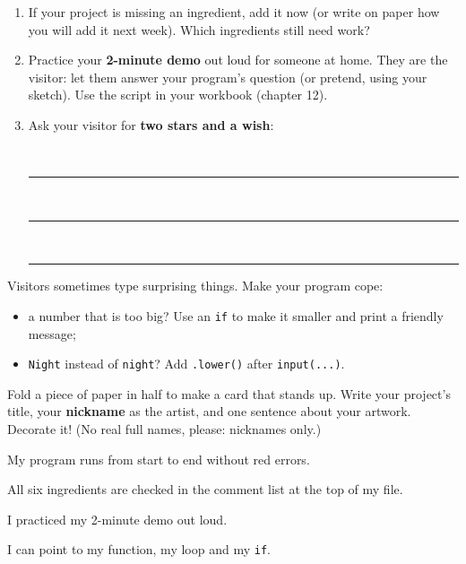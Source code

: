 \namedateline

\begin{core}
\begin{enumerate}[leftmargin=1.4em,itemsep=2pt]
  \item If your project is missing an ingredient, add it now (or write on paper how you will add it next week). Which ingredients still need work?
  \item Practice your \textbf{2-minute demo} out loud for someone at home. They are the visitor: let them answer your program's question (or pretend, using your sketch). Use the script in your workbook (chapter 12).
  \item Ask your visitor for \textbf{two stars and a wish}:\par
  \faStar\ \rule{11cm}{0.4pt}\par\smallskip
  \faStar\ \rule{11cm}{0.4pt}\par\smallskip
  \faMagic\ \rule{11cm}{0.4pt}
\end{enumerate}
\end{core}

\begin{challenge}
Visitors sometimes type surprising things. Make your program cope:
\begin{itemize}[leftmargin=1.2em,itemsep=1pt]
  \item a number that is too big? Use an \texttt{if} to make it smaller and print a friendly message;
  \item \texttt{Night} instead of \texttt{night}? Add \texttt{.lower()} after \texttt{input(...)}.
\end{itemize}
\end{challenge}

\begin{creative}
Fold a piece of paper in half to make a card that stands up. Write your project's title, your \textbf{nickname} as the artist, and one sentence about your artwork. Decorate it! (No real full names, please: nicknames only.)
\end{creative}

\begin{selfcheck}
  \item My program runs from start to end without red errors.
  \item All six ingredients are checked in the comment list at the top of my file.
  \item I practiced my 2-minute demo out loud.
  \item I can point to my function, my loop and my \texttt{if}.
\end{selfcheck}
